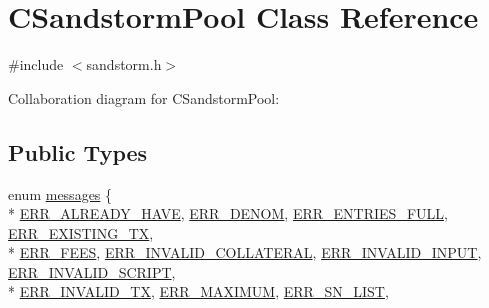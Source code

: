 \hypertarget{class_c_sandstorm_pool}{}\section{C\+Sandstorm\+Pool Class Reference}
\label{class_c_sandstorm_pool}


{\ttfamily \#include $<$sandstorm.\+h$>$}



Collaboration diagram for C\+Sandstorm\+Pool\+:
\subsection*{Public Types}
\begin{DoxyCompactItemize}
\item 
enum \hyperlink{class_c_sandstorm_pool_a539548228c53649bed42e158a86eded2}{messages} \{ \\*
\hyperlink{class_c_sandstorm_pool_a539548228c53649bed42e158a86eded2a2cb39f1970ed231a8168e1a8fefd042d}{E\+R\+R\+\_\+\+A\+L\+R\+E\+A\+D\+Y\+\_\+\+H\+A\+V\+E}, 
\hyperlink{class_c_sandstorm_pool_a539548228c53649bed42e158a86eded2a2727d0dcde9ffc488149dcc5f59dac58}{E\+R\+R\+\_\+\+D\+E\+N\+O\+M}, 
\hyperlink{class_c_sandstorm_pool_a539548228c53649bed42e158a86eded2a55776fc0a12adc3b13f3aa6e9e1f81f2}{E\+R\+R\+\_\+\+E\+N\+T\+R\+I\+E\+S\+\_\+\+F\+U\+L\+L}, 
\hyperlink{class_c_sandstorm_pool_a539548228c53649bed42e158a86eded2ab65911a0da944db7532e36fca3ecbe82}{E\+R\+R\+\_\+\+E\+X\+I\+S\+T\+I\+N\+G\+\_\+\+T\+X}, 
\\*
\hyperlink{class_c_sandstorm_pool_a539548228c53649bed42e158a86eded2ab4316c0b0f3099c03356e0f46628a508}{E\+R\+R\+\_\+\+F\+E\+E\+S}, 
\hyperlink{class_c_sandstorm_pool_a539548228c53649bed42e158a86eded2aee7148a9f7f9cf79846a310a9c61a3e5}{E\+R\+R\+\_\+\+I\+N\+V\+A\+L\+I\+D\+\_\+\+C\+O\+L\+L\+A\+T\+E\+R\+A\+L}, 
\hyperlink{class_c_sandstorm_pool_a539548228c53649bed42e158a86eded2a8fd4c302d1eab85bf72d5941f3d84625}{E\+R\+R\+\_\+\+I\+N\+V\+A\+L\+I\+D\+\_\+\+I\+N\+P\+U\+T}, 
\hyperlink{class_c_sandstorm_pool_a539548228c53649bed42e158a86eded2adb56e517793e4e747c9020e20fa52cc3}{E\+R\+R\+\_\+\+I\+N\+V\+A\+L\+I\+D\+\_\+\+S\+C\+R\+I\+P\+T}, 
\\*
\hyperlink{class_c_sandstorm_pool_a539548228c53649bed42e158a86eded2a84514dca9d5612b95e77dd13a8ab261d}{E\+R\+R\+\_\+\+I\+N\+V\+A\+L\+I\+D\+\_\+\+T\+X}, 
\hyperlink{class_c_sandstorm_pool_a539548228c53649bed42e158a86eded2ab52414cda269cecb60b8675531672e0a}{E\+R\+R\+\_\+\+M\+A\+X\+I\+M\+U\+M}, 
\hyperlink{class_c_sandstorm_pool_a539548228c53649bed42e158a86eded2a9636ac06a1f35cd7dc3a72419ccb3148}{E\+R\+R\+\_\+\+S\+N\+\_\+\+L\+I\+S\+T}, 

\end{DoxyCompactItemize}
